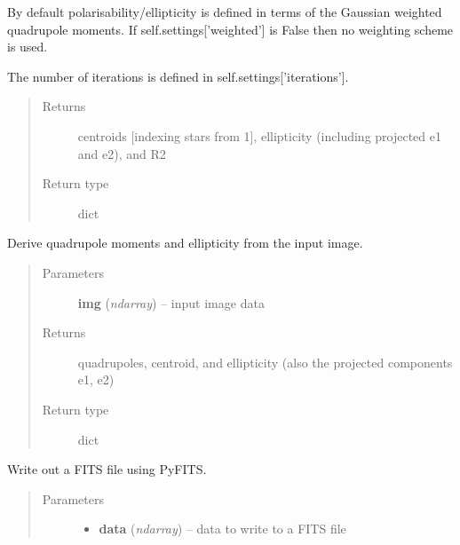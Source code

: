 \documentclass[a4paper,11pt,english]{sphinxmanual}
\begin{document}
\begin{fulllineitems}
\begin{fulllineitems}
By default polarisability/ellipticity is defined in terms of the Gaussian weighted quadrupole moments.
If self.settings{[}'weighted'{]} is False then no weighting scheme is used.

The number of iterations is defined in self.settings{[}'iterations'{]}.
\begin{quote}\begin{description}
\item[{Returns}] \leavevmode
centroids {[}indexing stars from 1{]}, ellipticity (including projected e1 and e2), and R2

\item[{Return type}] \leavevmode
dict

\end{description}\end{quote}

\end{fulllineitems}


\begin{fulllineitems}
\label{analysis:analysis.shape.shapeMeasurement.quadrupoles}
Derive quadrupole moments and ellipticity from the input image.
\begin{quote}\begin{description}
\item[{Parameters}] \leavevmode
\textbf{img} (\emph{ndarray}) -- input image data

\item[{Returns}] \leavevmode
quadrupoles, centroid, and ellipticity (also the projected components e1, e2)

\item[{Return type}] \leavevmode
dict

\end{description}\end{quote}

\end{fulllineitems}


\begin{fulllineitems}
\label{analysis:analysis.shape.shapeMeasurement.writeFITS}
Write out a FITS file using PyFITS.
\begin{quote}\begin{description}
\item[{Parameters}] \leavevmode\begin{itemize}
\item {} 
\textbf{data} (\emph{ndarray}) -- data to write to a FITS file


\end{itemize}
\end{description}
\end{quote}
\end{fulllineitems}
\end{fulllineitems}
\end{document}
